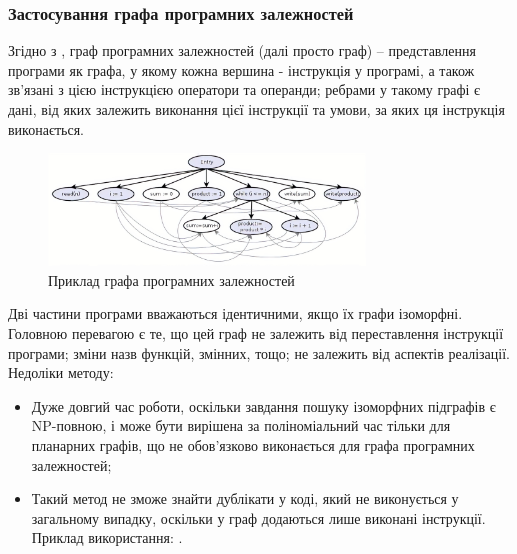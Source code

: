 \documentclass[a4paper, 14pt]{article}
\begin{document}
\subsubsection{Застосування графа програмних залежностей}
Згідно з \cite{Ferrante87}, граф програмних залежностей (далі просто граф) -- представлення програми як графа, у якому кожна вершина - інструкція у програмі, а також зв'язані з цією інструкцією оператори та операнди; ребрами у такому графі є дані, від яких залежить виконання цієї інструкції та умови, за яких ця інструкція виконається.
\begin{figure}[h]
    \centering
    \includegraphics[width=0.75\textwidth]{pdg-example}
    \caption{Приклад графа програмних залежностей \cite{pdg-example}}
    \label{fig:pdg-example}
\end{figure} 
Дві частини програми вважаються ідентичними, якщо їх графи ізоморфні.
Головною перевагою є те, що цей граф не залежить від переставлення інструкції програми; зміни назв функцій, змінних, тощо; не залежить від аспектів реалізації.
Недоліки методу:
\begin{itemize}
\item Дуже довгий час роботи, оскільки завдання пошуку ізоморфних підграфів є NP-повною, і може бути вирішена за поліноміальний час тільки для планарних графів, що не обов'язково виконається для графа програмних залежностей;
\item Такий метод не зможе знайти дублікати у коді, який не виконується у загальному випадку, оскільки у граф додаються лише виконані інструкції.
Приклад використання: \cite{Liu06}.
\end{itemize}
\end{document}
